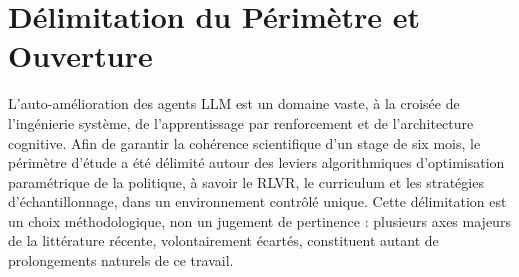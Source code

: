 \documentclass[11pt,a4paper]{article}
\begin{document}
\section{Délimitation du Périmètre et Ouverture}

L'auto-amélioration des agents LLM est un domaine vaste, à la croisée de l'ingénierie système, de l'apprentissage par renforcement et de l'architecture cognitive. Afin de garantir la cohérence scientifique d'un stage de six mois, le périmètre d'étude a été délimité autour des leviers algorithmiques d'optimisation paramétrique de la politique, à savoir le RLVR, le curriculum et les stratégies d'échantillonnage, dans un environnement contrôlé unique. Cette délimitation est un choix méthodologique, non un jugement de pertinence : plusieurs axes majeurs de la littérature récente, volontairement écartés, constituent autant de prolongements naturels de ce travail.
\end{document}
